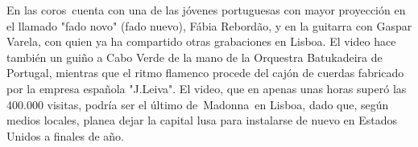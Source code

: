\documentclass{article}%
\begin{document}
\newline%
%
En las coros~cuenta con una de las jóvenes portuguesas con mayor proyección en el llamado "fado novo" (fado nuevo), Fábia Rebordão, y en la guitarra con Gaspar Varela, con quien ya ha compartido otras grabaciones en Lisboa.%
\newline%
%
El video hace también un guiño a Cabo Verde de la mano de la Orquestra Batukadeira de Portugal, mientras que el ritmo flamenco procede del cajón de cuerdas fabricado por la empresa española "J.Leiva".%
\newline%
%
El video, que en apenas unas horas superó las 400.000 visitas, podría ser el último de~Madonna~en Lisboa, dado que, según medios locales, planea dejar la capital lusa para instalarse de nuevo en Estados Unidos a finales de año.%
\newline%
%
\end{document}
